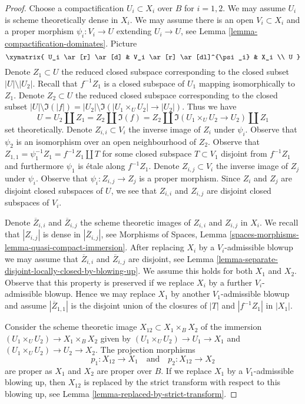 \begin{proof}
Choose a compactification $U_i \subset X_i$ over $B$ for $i = 1, 2$. We may
assume $U_i$ is scheme theoretically dense in $X_i$. We may assume there
is an open $V_i \subset X_i$ and a proper morphism
$\psi_i : V_i \to U$ extending $U_i \to U$, see
Lemma \ref{lemma-compactification-dominates}. Picture
$$
\xymatrix{
U_i \ar[r] \ar[d] & V_i \ar[r] \ar[dl]^{\psi_i} & X_i \\
U
}
$$
Denote $Z_1 \subset U$ the reduced closed subspace corresponding
to the closed subset $|U| \setminus |U_2|$. Recall that $f^{-1}Z_1$
is a closed subspace of $U_1$ mapping isomorphically to $Z_1$.
Denote $Z_2 \subset U$ the reduced closed subspace corresponding
to the closed subset $|U| \setminus \Im(|f|) =
|U_2| \setminus \Im(|U_1 \times_U U_2| \to |U_2|)$.
Thus we have
$$
U = U_2 \amalg Z_1 = Z_2 \amalg \Im(f) =
Z_2 \amalg \Im(U_1 \times_U U_2 \to U_2) \amalg Z_1
$$
set theoretically. Denote $Z_{i, i} \subset V_i$ the inverse image of $Z_i$
under $\psi_i$. Observe that $\psi_2$ is an isomorphism over an open
neighbourhood of $Z_2$. Observe that
$Z_{1, 1} = \psi_1^{-1}Z_1 = f^{-1}Z_1 \amalg T$ for some
closed subspace $T \subset V_1$ disjoint from $f^{-1}Z_1$ and furthermore
$\psi_1$ is \'etale along $f^{-1}Z_1$.
Denote $Z_{i, j} \subset V_i$ the inverse image of $Z_j$ under $\psi_i$.
Observe that $\psi_i : Z_{i, j} \to Z_j$ is a proper morphism.
Since $Z_i$ and $Z_j$ are disjoint closed subspaces of $U$, we see that
$Z_{i, i}$ and $Z_{i, j}$ are disjoint closed subspaces of $V_i$.

\medskip\noindent
Denote $\overline{Z}_{i, i}$ and $\overline{Z}_{i, j}$ the
scheme theoretic images of $Z_{i, i}$ and $Z_{i, j}$ in $X_i$.
We recall that $|Z_{i, j}|$ is dense in $|\overline{Z}_{i, j}|$, see
Morphisms of Spaces, Lemma
\ref{spaces-morphisms-lemma-quasi-compact-immersion}.
After replacing $X_i$ by a $V_i$-admissible blowup we may assume that
$\overline{Z}_{i, i}$ and $\overline{Z}_{i, j}$ are disjoint, see
Lemma \ref{lemma-separate-disjoint-locally-closed-by-blowing-up}.
We assume this holds for both $X_1$ and $X_2$.
Observe that this property is preserved if we replace $X_i$
by a further $V_i$-admissible blowup. Hence we may replace $X_1$ by another
$V_1$-admissible blowup and assume $|\overline{Z}_{1, 1}|$
is the disjoint union of the closures of $|T|$ and $|f^{-1}Z_1|$ in $|X_1|$.

\medskip\noindent
Consider the scheme theoretic image $X_{12} \subset X_1 \times_B X_2$
of the immersion $(U_1 \times_U U_2) \to X_1 \times_B X_2$ given by
$(U_1 \times_U U_2) \to U_1 \to X_1$ and $(U_1 \times_U U_2) \to U_2 \to X_2$.
The projection morphisms
$$
p_1 : X_{12} \to X_1
\quad\text{and}\quad
p_2 : X_{12} \to X_2
$$
are proper as $X_1$ and $X_2$ are proper over $B$. If we replace $X_1$ by a
$V_1$-admissible blowing up, then $X_{12}$ is replaced by
the strict transform with respect to this blowing up, see
Lemma \ref{lemma-replaced-by-strict-transform}.


\end{proof}
